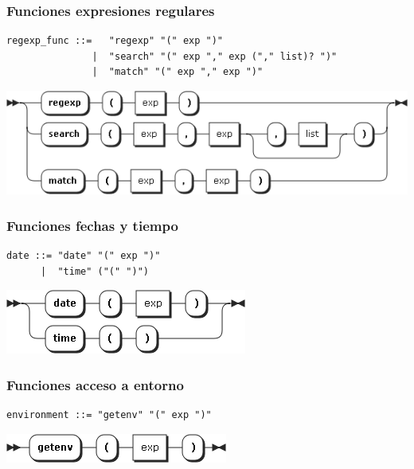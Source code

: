\subsubsection{Funciones expresiones regulares}
\begin{lstlisting}[style=nonumbers]      
regexp_func ::=   "regexp" "(" exp ")"
               |  "search" "(" exp "," exp ("," list)? ")"
               |  "match" "(" exp "," exp ")"
\end{lstlisting}  
\begin{center}
\includegraphics[scale=0.5]{diagram/regexp_func.png} \\
\end{center}

\subsubsection{Funciones fechas y tiempo}
\begin{multicols}{2}
\begin{lstlisting}[style=nonumbers]      
date ::= "date" "(" exp ")"
      |  "time" ("(" ")")
\end{lstlisting}  
\columnbreak	
\begin{center}
\includegraphics[scale=0.5]{diagram/date.png} \\
\end{center}
\end{multicols}

\subsubsection{Funciones acceso a entorno}
\begin{multicols}{2}
\begin{lstlisting}[style=nonumbers]      
environment ::= "getenv" "(" exp ")"
\end{lstlisting}  
\columnbreak	
\begin{center}
\includegraphics[scale=0.4]{diagram/environment.png} \\
\end{center}
\end{multicols}

